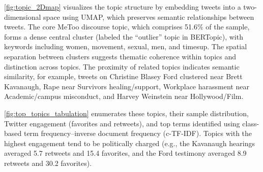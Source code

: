 \documentclass[manuscript,screen,nonacm,11pt,acm]{acmart}
\begin{document}
\begin{bibunit}
\cref{fig:topic_2Dmap} visualizes the topic structure by embedding tweets into a two-dimensional space using UMAP, which preserves semantic relationships between tweets.
The core MeToo discourse topic, which comprises 51.6\% of the sample, forms a dense central cluster (labeled the ``outlier'' topic in BERTopic), with keywords including women, movement, sexual, men, and timesup.
The spatial separation between clusters suggests thematic coherence within topics and distinction across topics.
The proximity of related topics indicates semantic similarity, for example, tweets on Christine Blasey Ford clustered near Brett Kavanaugh, Rape near Survivors healing/support, Workplace harassment near Academic/campus misconduct, and Harvey Weinstein near Hollywood/Film.

\cref{fig:top_topics_tabulation} enumerates these topics, their sample distribution, Twitter engagement (favorites and retweets), and top terms identified using class-based term frequency–inverse document frequency (c-TF-IDF).
Topics with the highest engagement tend to be politically charged (e.g., the Kavanaugh hearings averaged 5.7 retweets and 15.4 favorites, and the Ford testimony averaged 8.9 retweets and 30.2 favorites).

\FloatBarrier

\end{bibunit}
\end{document}
